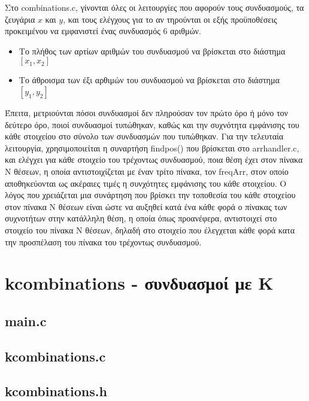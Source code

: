 \documentclass{article}
\begin{document}
    Στο combinations.c, γίνονται όλες οι λειτουργίες που αφορούν τους συνδυασμούς, τα ζευγάρια $x$ και $y$, και τους
    ελέγχους για το αν τηρούνται οι εξής προϋποθέσεις προκειμένου να εμφανιστεί ένας συνδυασμός 6 αριθμών.
    
    \begin{itemize}
        \item Το πλήθος των αρτίων αριθμών του συνδυασμού να βρίσκεται στο διάστημα $[x_{1}, x_{2}]$
        \item Το άθροισμα των έξι αρθιμών του συνδυασμού να βρίσκεται στο διάστημα $[y_{1}, y_{2}]$
    \end{itemize}

    Έπειτα, μετριούνται πόσοι συνδυασμοί δεν πληρούσαν τον πρώτο όρο ή μόνο τον δεύτερο όρο, ποιοί συνδυασμοί τυπώθηκαν,
    καθώς και την συχνότητα εμφάνισης του κάθε στοιχείου στο σύνολο των συνδυασμών που τυπώθηκαν.
    Για την τελευταία λειτουργία, χρησιμοποιείται η συναρτήση findpos() που βρίσκεται στο arrhandler.c, και ελέγχει για κάθε
    στοιχείο του τρέχοντως συνδυασμού, ποια θέση έχει στον πίνακα Ν θέσεων, η οποία αντιστοιχίζεται με έναν τρίτο πίνακα,
    τον freqArr, στον οποίο αποθηκεύονται ως ακέραιες τιμές η συνχότητες εμφάνισης του κάθε στοιχείου.
    Ο λόγος που χρειάζεται μια συνάρτηση που βρίσκει την τοποθεσία του κάθε στοιχείου στον πίνακα Ν θέσεων είναι ώστε να αυξηθεί κατά 
    ένα κάθε φορά ο πίνακας των συχνοτήτων στην κατάλληλη θέση, η οποία όπως προανέφερα, αντιστοιχεί στο στοιχείο του πίνακα Ν θέσεων, 
    δηλαδή στο στοιχείο που έλεγχεται κάθε φορά κατα την προσπέλαση του πίνακα του τρέχοντως συνδυασμού.

\section{kcombinations - συνδυασμοί με K}

    \subsection{main.c}
        

    \subsection{kcombinations.c}
        

    \subsection{kcombinations.h}
        
\end{document}
